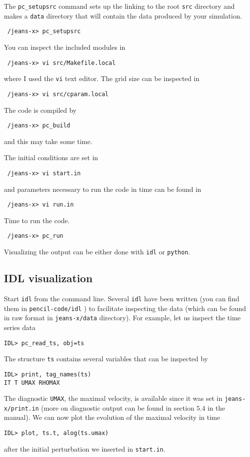 \documentclass[a4paper,12pt]{article}
\begin{document}
The \verb|pc_setupsrc| command sets up the linking to the root \verb|src|
directory and makes a \verb|data| directory that will contain the data produced
by your simulation.
\begin{verbatim}
 /jeans-x> pc_setupsrc
\end{verbatim}

You can inspect the included modules in
\begin{verbatim}
 /jeans-x> vi src/Makefile.local 
\end{verbatim}
where I used the \verb|vi| text editor. The grid size can be inspected in 
\begin{verbatim}
 /jeans-x> vi src/cparam.local 
\end{verbatim}

The code is compiled by
\begin{verbatim}
 /jeans-x> pc_build
\end{verbatim}
and this may take some time.

The initial conditions are set in
\begin{verbatim}
 /jeans-x> vi start.in
\end{verbatim}

and parameters necessary to run the code in time can be found in
\begin{verbatim}
 /jeans-x> vi run.in
\end{verbatim}

Time to run the code. 
\begin{verbatim}
 /jeans-x> pc_run
\end{verbatim}

Visualizing the output can be either done with \verb|idl| or \verb|python|.

\subsection{IDL visualization}

Start \verb|idl| from the command line. Several \verb|idl| have been written
(you can find them in \verb|pencil-code/idl| ) to facilitate inspecting the data
(which can be found in raw format in \verb|jeans-x/data| directory).  For
example, let us inspect the time series data
\begin{verbatim}
IDL> pc_read_ts, obj=ts
\end{verbatim}
The structure \verb|ts| contains several variables that can be inspected by
\begin{verbatim}
IDL> print, tag_names(ts)
IT T UMAX RHOMAX
\end{verbatim}
The diagnostic \verb|UMAX|, the maximal velocity, is available since it was set
in \verb|jeans-x/print.in| (more on diagnostic output can be found in section
$5.4$ in the manual).  We can now plot the evolution of the maximal velocity in
time
\begin{verbatim}
IDL> plot, ts.t, alog(ts.umax)
\end{verbatim}
after the initial perturbation we inserted in \verb|start.in|.
\end{document}
